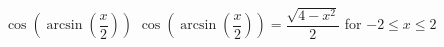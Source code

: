  {$\cos\left(\arcsin\left(\dfrac{x}{2}\right)\right)$}
{ $\cos\left(\arcsin\left(\dfrac{x}{2}\right)\right) = \dfrac{\sqrt{4-x^2}}{2}$ for $-2 \leq x \leq 2$}
